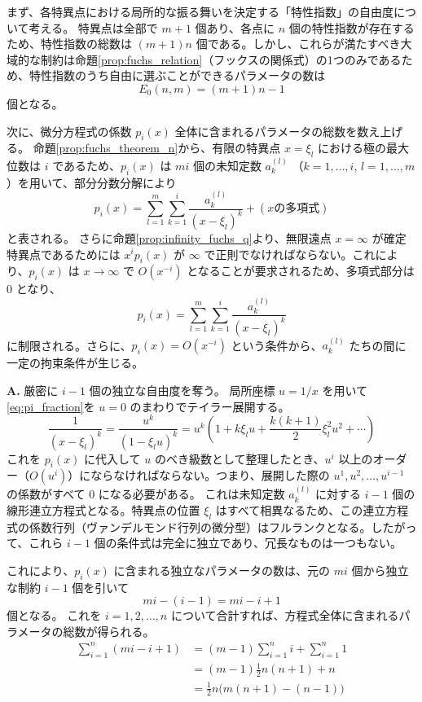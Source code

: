 まず、各特異点における局所的な振る舞いを決定する「特性指数」の自由度について考える。
特異点は全部で $m+1$ 個あり、各点に $n$ 個の特性指数が存在するため、特性指数の総数は $(m+1)n$ 個である。しかし、これらが満たすべき大域的な制約は命題\ref{prop:fuchs_relation}（フックスの関係式）の1つのみであるため、特性指数のうち自由に選ぶことができるパラメータの数は
\begin{equation}
E_{0}(n,m) = (m+1)n - 1
\end{equation}
個となる。

次に、微分方程式の係数 $p_{i}(x)$ 全体に含まれるパラメータの総数を数え上げる。
命題\ref{prop:fuchs_theorem_n}から、有限の特異点 $x=\xi_{l}$ における極の最大位数は $i$ であるため、$p_{i}(x)$ は $mi$ 個の未知定数 $a_{k}^{(l)}$ （$k=1,\dots,i$, $l=1,\dots,m$）を用いて、部分分数分解により
\[
p_{i}(x) = \sum_{l=1}^{m}\sum_{k=1}^{i} \frac{a_{k}^{(l)}}{(x-\xi_{l})^{k}} + (x\text{の多項式})
\]
と表される。
さらに命題\ref{prop:infinity_fuchs_q}より、無限遠点 $x=\infty$ が確定特異点であるためには $x^{i}p_{i}(x)$ が $\infty$ で正則でなければならない。これにより、$p_{i}(x)$ は $x \to \infty$ で $O(x^{-i})$ となることが要求されるため、多項式部分は $0$ となり、
\begin{equation}\label{eq:pi_fraction}
p_{i}(x) = \sum_{l=1}^{m}\sum_{k=1}^{i} \frac{a_{k}^{(l)}}{(x-\xi_{l})^{k}}
\end{equation}
に制限される。さらに、$p_{i}(x) = O(x^{-i})$ という条件から、$a_{k}^{(l)}$ たちの間に一定の拘束条件が生じる。

\begin{Q}[【核心】$p_{i}(x) = O(x^{-i})$ という無限遠点での条件は、具体的にいくつの独立なパラメータを奪う（束縛する）のか？]
\textbf{A.} 厳密に $i-1$ 個の独立な自由度を奪う。
局所座標 $u=1/x$ を用いて\eqref{eq:pi_fraction}を $u=0$ のまわりでテイラー展開する。
\[
\frac{1}{(x-\xi_{l})^{k}} = \frac{u^{k}}{(1-\xi_{l}u)^{k}} = u^{k} \left( 1 + k\xi_{l}u + \frac{k(k+1)}{2}\xi_{l}^{2}u^{2} + \cdots \right)
\]
これを $p_{i}(x)$ に代入して $u$ のべき級数として整理したとき、$u^{i}$ 以上のオーダー（$O(u^{i})$）にならなければならない。つまり、展開した際の $u^{1}, u^{2}, \dots, u^{i-1}$ の係数がすべて $0$ になる必要がある。
これは未知定数 $a_{k}^{(l)}$ に対する $i-1$ 個の線形連立方程式となる。特異点の位置 $\xi_{l}$ はすべて相異なるため、この連立方程式の係数行列（ヴァンデルモンド行列の微分型）はフルランクとなる。したがって、これら $i-1$ 個の条件式は完全に独立であり、冗長なものは一つもない。
\end{Q}

これにより、$p_{i}(x)$ に含まれる独立なパラメータの数は、元の $mi$ 個から独立な制約 $i-1$ 個を引いて
\[
mi - (i-1) = m i - i + 1
\]
個となる。
これを $i=1, 2, \dots, n$ について合計すれば、方程式全体に含まれるパラメータの総数が得られる。
\begin{align*}
\sum_{i=1}^{n} (mi - i + 1) &= (m-1)\sum_{i=1}^{n} i + \sum_{i=1}^{n} 1 \\
&= (m-1)\frac{1}{2}n(n+1) + n \\
&= \frac{1}{2}n \big( m(n+1) - (n-1) \big)
\end{align*}

